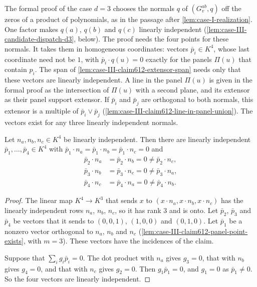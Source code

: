 The formal proof of the case $d = 3$ chooses the normals $q$ of
$(G_v^{ab}, q)$ off the zeros of a product of polynomials, as in the
passage after \cref{lem:case-I-realization}. One factor makes $q(a)$,
$q(b)$ and $q(c)$ linearly independent
(\cref{lem:case-III-candidate-dispatch-d3}, below). The proof needs
the four points for these normals. It takes them in homogeneous
coordinates: vectors $\bar p_i \in K^4$, whose last coordinate need
not be $1$, with $\bar p_i \cdot q(u) = 0$ exactly for the panels
$\Pi(u)$ that contain $p_i$. The span of
\cref{lem:case-III-claim612-extensor-span} needs only that these
vectors are linearly independent. A line in the panel $\Pi(u)$ is
given in the formal proof as the intersection of $\Pi(u)$ with a
second plane, and its extensor as their panel support extensor. If
$\bar p_i$ and $\bar p_j$ are orthogonal to both normals, this
extensor is a multiple of $\bar p_i \vee \bar p_j$
(\cref{lem:case-III-claim612-line-in-panel-union}). The vectors exist
for any three linearly independent normals.

\begin{lemma}
  \label{lem:case-III-claim612-points-affineIndep-real-normals}
  \leanok
  Let $n_a, n_b, n_c \in K^4$ be linearly independent. Then there are
  linearly independent $\bar p_1, \dots, \bar p_4 \in K^4$ with
  $\bar p_1 \cdot n_a = \bar p_1 \cdot n_b = \bar p_1 \cdot n_c = 0$ and
  \begin{align*}
    \bar p_2 \cdot n_a &= \bar p_2 \cdot n_b = 0 \neq \bar p_2 \cdot n_c, \\
    \bar p_3 \cdot n_b &= \bar p_3 \cdot n_c = 0 \neq \bar p_3 \cdot n_a, \\
    \bar p_4 \cdot n_c &= \bar p_4 \cdot n_a = 0 \neq \bar p_4 \cdot n_b.
  \end{align*}
\end{lemma}
\begin{proof}
  \leanok
  The linear map $K^4 \to K^3$ that sends $x$ to
  $(x \cdot n_a, x \cdot n_b, x \cdot n_c)$ has the linearly
  independent rows $n_a$, $n_b$, $n_c$, so it has rank $3$ and is onto.
  Let $\bar p_2$, $\bar p_3$ and $\bar p_4$ be vectors that it sends to
  $(0, 0, 1)$, $(1, 0, 0)$ and $(0, 1, 0)$. Let $\bar p_1$ be a nonzero
  vector orthogonal to $n_a$, $n_b$ and $n_c$
  (\cref{lem:case-III-claim612-panel-point-exists}, with $m = 3$). These
  vectors have the incidences of the claim.

  Suppose that $\sum_i g_i \bar p_i = 0$. The dot product with $n_a$
  gives $g_3 = 0$, that with $n_b$ gives $g_4 = 0$, and that with $n_c$
  gives $g_2 = 0$. Then $g_1 \bar p_1 = 0$, and $g_1 = 0$ as
  $\bar p_1 \neq 0$. So the four vectors are linearly independent.
\end{proof}

